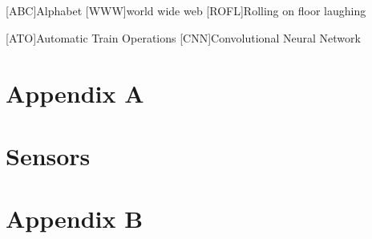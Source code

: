 \documentclass[Master,MDS,english]{BASE/twbook} %
\begin{document}
\clearpage

\listoffigures                                                   %
\clearpage

\listoftables                                                    %
\clearpage

\listoflistings                                                  %
\clearpage

{}
\chapter*{\listacroname}
\begin{acronym}[XXXXX]
    [ABC]{Alphabet}
    [WWW]{world wide web}
    [ROFL]{Rolling on floor laughing}
    
    
    
    [ATO]{Automatic Train Operations}
    [CNN]{Convolutional Neural Network}
    
\end{acronym}
\clearpage
\appendix
\chapter{Appendix A}

\chapter{Sensors}




\clearpage
\chapter{Appendix B}
\end{document}
